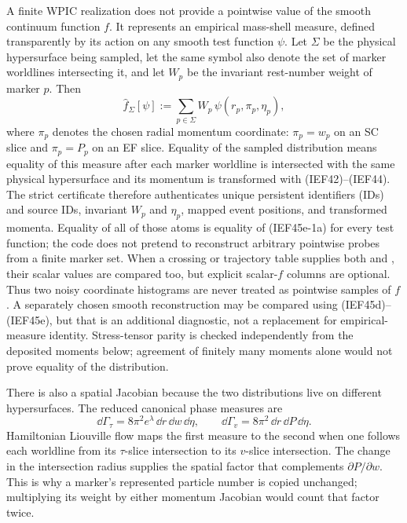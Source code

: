 A finite WPIC realization does not provide a pointwise value of the smooth
continuum function \(f\).  It represents an empirical mass-shell measure,
defined transparently by its action on any smooth test function \(\psi\).
Let \(\Sigma\) be the physical hypersurface being sampled, let the same symbol
also denote the set of marker worldlines intersecting it, and let \(W_p\) be
the invariant rest-number weight of marker \(p\).  Then
\[
 \widehat f_{\Sigma}[\psi]
 :=\sum_{p\in\Sigma}W_p\,
   \psi(r_p,\pi_p,\eta_p),                              \tag{IEF45e-1a}
\]
where \(\pi_p\) denotes the chosen radial momentum coordinate:
\(\pi_p=w_p\) on an SC slice and \(\pi_p=P_p\) on an EF slice.  Equality
of the sampled distribution means equality of this measure after each marker
worldline is intersected with the same physical hypersurface and its momentum
is transformed with (IEF42)--(IEF44).  The strict certificate therefore
authenticates unique persistent identifiers (IDs) and source IDs, invariant
\(W_p\) and
\(\eta_p\), mapped event positions, and transformed momenta.  Equality of all
of those atoms is equality of (IEF45e-1a) for every test function; the code
does not pretend to reconstruct arbitrary pointwise probes from a finite
marker set.  When a crossing or trajectory table supplies both
 and , their scalar
values are compared too, but explicit scalar-\(f\) columns are optional.
Thus two noisy coordinate histograms are never treated as pointwise samples
of \(f\).  A separately chosen smooth reconstruction may be compared using
(IEF45d)--(IEF45e), but that is an additional diagnostic, not a replacement
for empirical-measure identity.  Stress-tensor parity is checked independently
from the deposited moments below; agreement of finitely many moments alone
would not prove equality of the distribution.

There is also a spatial Jacobian because the two distributions live on
different hypersurfaces.  The reduced canonical phase measures are
\[
 \dd\Gamma_\tau=8\pi^2e^\lambda\,
       \dd r\,\dd w\,\dd\eta,
 \qquad
 \dd\Gamma_v=8\pi^2\,
       \dd r\,\dd P\,\dd\eta .                       \tag{IEF45e-2}
\]
Hamiltonian Liouville flow maps the first measure to the second when one
follows each worldline from its \(\tau\)-slice intersection to its
\(v\)-slice intersection.  The change in the intersection radius supplies
the spatial factor that complements \(\partial P/\partial w\).  This is why
a marker's represented particle number is copied unchanged; multiplying its
weight by either momentum Jacobian would count that factor twice.

